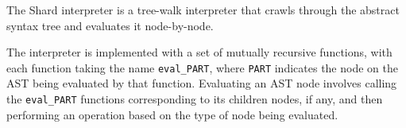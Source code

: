\documentclass[twoside]{report}
\begin{document}
The Shard interpreter is a tree-walk interpreter that crawls through the abstract syntax tree and evaluates it node-by-node.

The interpreter is implemented with a set of mutually recursive functions, with each function taking the name \texttt{eval\_PART}, where \texttt{PART} indicates the node on the AST being evaluated by that function.
Evaluating an AST node involves calling the \texttt{eval\_PART} functions corresponding to its children nodes, if any, and then performing an operation based on the type of node being evaluated.







\end{document}
